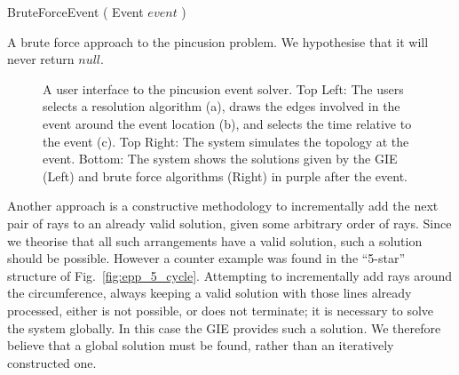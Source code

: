 \begin{algorithm} [htb]
\begin{footnotesize}
  BruteForceEvent ( Event $event$ ) 
\end{footnotesize}
  \caption[A brute force approach to the pincusion problem]{A brute force approach to the pincusion problem. We hypothesise that it will never return $null$.}
  \label{code:brute_force_pincushion}
\end{algorithm}

\begin{figure}
  \centering
  \def\svgwidth{0.7\columnwidth}
  
  \caption[Brute force application]{\label{fig:bute_app_screenies}A user interface to the pincusion event solver. Top Left: The users selects a resolution algorithm (a), draws the edges involved in the event around the event location (b), and selects the time relative to the event (c). Top Right: The system simulates the topology at the event. Bottom: The system shows the solutions given by the GIE (Left) and brute force algorithms (Right) in purple after the event.}
\end{figure}

Another approach is a constructive methodology to incrementally add the next pair of rays to an already valid solution, given some arbitrary order of rays. Since we theorise that all such arrangements have a valid solution, such a solution should be possible. However a counter example was found in the ``5-star'' structure of Fig.~\ref{fig:epp_5_cycle}. Attempting to incrementally add rays around the circumference, always keeping a valid solution with those lines already processed, either is not possible, or does not terminate; it is necessary to solve the system globally. In this case the GIE provides such a solution. We therefore believe that a global solution must be found, rather than an iteratively constructed one.

